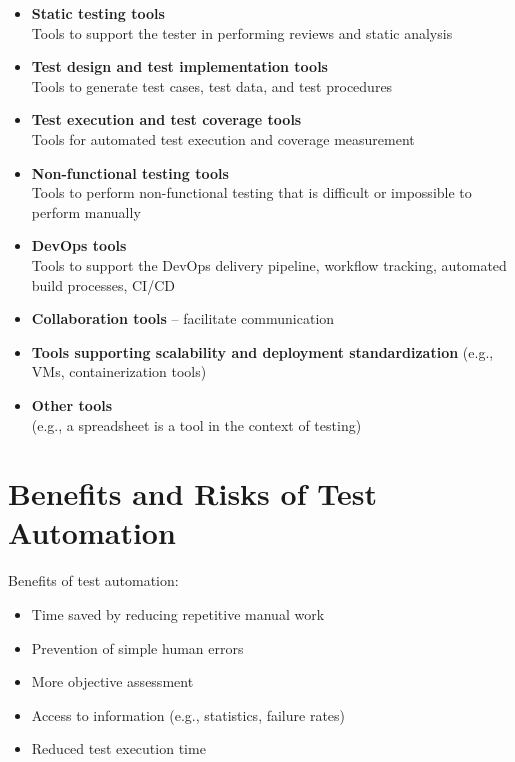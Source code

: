 \documentclass{article}
\begin{document}
\begin{multicols}{3}
{\begin{itemize}
  \item \textbf{Static testing tools}\\
  Tools to support the tester in performing reviews and static analysis
  
  \item \textbf{Test design and test implementation tools}\\
  Tools to generate test cases, test data, and test procedures
  
  \item \textbf{Test execution and test coverage tools}\\
  Tools for automated test execution and coverage measurement
  
  \item \textbf{Non-functional testing tools}\\
  Tools to perform non-functional testing that is difficult or impossible to perform manually
  
  \item \textbf{DevOps tools}\\
  Tools to support the DevOps delivery pipeline, workflow tracking, automated build processes, CI/CD
  
  \item \textbf{Collaboration tools} – facilitate communication
  \item \textbf{Tools supporting scalability and deployment standardization} (e.g., VMs, containerization tools)
  \item \textbf{Other tools}\\
  (e.g., a spreadsheet is a tool in the context of testing)
\end{itemize}

\section*{Benefits and Risks of Test Automation}
Benefits of test automation:
\begin{itemize}
  \item Time saved by reducing repetitive manual work
  \item Prevention of simple human errors
  \item More objective assessment
  \item Access to information (e.g., statistics, failure rates)
  \item Reduced test execution time
\end{itemize}

}
\end{multicols}
\end{document}
